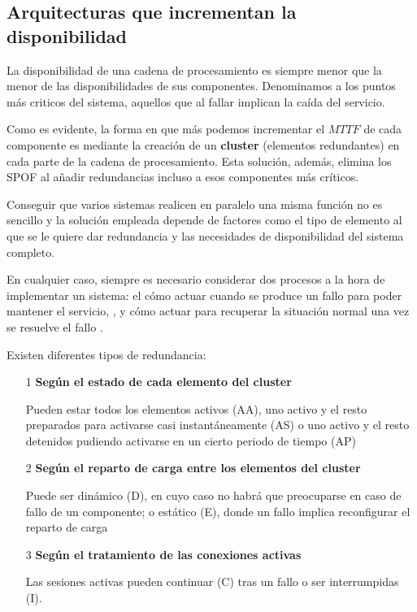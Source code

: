 \documentclass{apuntes}[nochap]
\begin{document}
\subsection{Arquitecturas que incrementan la disponibilidad}

La disponibilidad de una cadena de procesamiento es siempre menor que la menor de las disponibilidades de sus componentes. Denominamos  a los puntos más criticos del sistema, aquellos que al fallar implican la caída del servicio.

Como es evidente, la forma en que más podemos incrementar el $MTTF$ de cada componente es mediante la creación de un \textbf{cluster} (elementos redundantes) en cada parte de la cadena de procesamiento. Esta solución, además, elimina los SPOF al añadir redundancias incluso a esos componentes más críticos.

Conseguir que varios sistemas realicen en paralelo una misma función no es sencillo y la solución empleada depende de factores como el tipo de elemento al que se le quiere dar redundancia y las necesidades de disponibilidad del sistema completo.

En cualquier caso, siempre es necesario considerar dos procesos a la hora de implementar un sistema: el cómo actuar cuando se produce un fallo para poder mantener el servicio, , y cómo actuar para recuperar la situación normal una vez se resuelve el fallo .

Existen diferentes tipos de redundancia:
\begin{enumerate}
\item[1] \textbf{Según el estado de cada elemento del cluster}

Pueden estar todos los elementos activos (AA), uno activo y el resto preparados para activarse casi instantáneamente (AS) o uno activo y el resto detenidos pudiendo activarse en un cierto periodo de tiempo (AP)

\item[2] \textbf{Según el reparto de carga entre los elementos del cluster}

Puede ser dinámico (D), en cuyo caso no habrá que preocuparse en caso de fallo de un componente; o estático (E), donde un fallo implica reconfigurar el reparto de carga

\item[3] \textbf{Según el tratamiento de las conexiones activas}

Las sesiones activas pueden continuar (C) tras un fallo o ser interrumpidas (I).
\end{enumerate}
\end{document}
